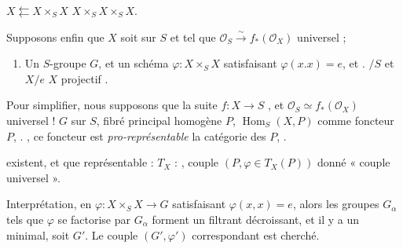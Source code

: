 \documentclass[11pt,a4paper]{article}
\begin{document}

$X \leftleftarrows X \times_S X$ \ill{} $X \times_S X \times_S X$.

Supposons enfin que \struck{\ill{}} $X$ soit \struck{\ill{}}
 sur $S$ et tel que
$\mathcal{O}_S \xrightarrow{\sim} f_*(\mathcal{O}_X)$ universel ; \ill{}
\ill{} \ill{} \ill{} \ill{}
\begin{enumerate}
  \item[(iii)] Un $S$-groupe $G$, et un schéma
  $\varphi \colon X \times_S X$ \ill{} satisfaisant $\varphi(x.x) = e$, et
  \ill{} \ill{} \ill{}. \ill{} \ill{}$/S$ et $X/e$ \ill{} \ill{} \ill{}
  \ill{} $X$ projectif \ill{}.
\end{enumerate}

Pour simplifier, nous supposons que la suite $f \colon X \to S$
, et \ill{} $\mathcal{O}_S \simeq f_*(\mathcal{O}_X)$
universel ! \ill{} \ill{} \add{\ill{}} \ill{} \ill{} \ill{} \ill{} $G$
 sur $S$, \ill{} \ill{} \ill{} fibré principal
homogène \ill{} $P$, \ill{} \ill{} \ill{} \ill{} \ill{} \ill{} \ill{} \ill{}
$\operatorname{Hom}_S(X, P)$ comme foncteur \ill{} \ill{} \ill{} $P$,
. \ill{} \ill{} \ill{}, ce foncteur est
\emph{pro-représentable} \ill{} la catégorie des $P$, \ill{} \ill{}
\emph{\ill{}}. \ill{} \ill{} \ill{} \ill{}

\ill{} existent, et que \ill{} \ill{} \ill{} \ill{} représentable : \ill{}
\ill{} \ill{} $T_X$ \ill{} \ill{} : \ill{}, \ill{} \ill{} \ill{} \ill{}
\ill{} \ill{} \ill{} couple $(P, \varphi \in T_X(P))$ \ill{} \ill{} \ill{}
\struck{\ill{}} donné \ill{} \ill{} \ill{} \ill{} « couple universel ».

Interprétation, en \ill{} \ill{} \ill{} \ill{} \ill{} \ill{}
$\varphi \colon X \times_S X \to G$ satisfaisant $\varphi(x,x) = e$, alors
\struck{\ill{}} les \ill{} \ill{} \ill{} groupes \ill{} $G_\alpha$ \ill{}
\ill{} tels que $\varphi$ se factorise par $G_\alpha$ \ill{} forment un
\ill{} filtrant décroissant, et \ill{} \ill{} \ill{} il y a un \ill{} \ill{}
minimal, soit $G'$. Le couple $(G', \varphi')$ correspondant est \ill{}
\ill{} cherché.
\end{document}
